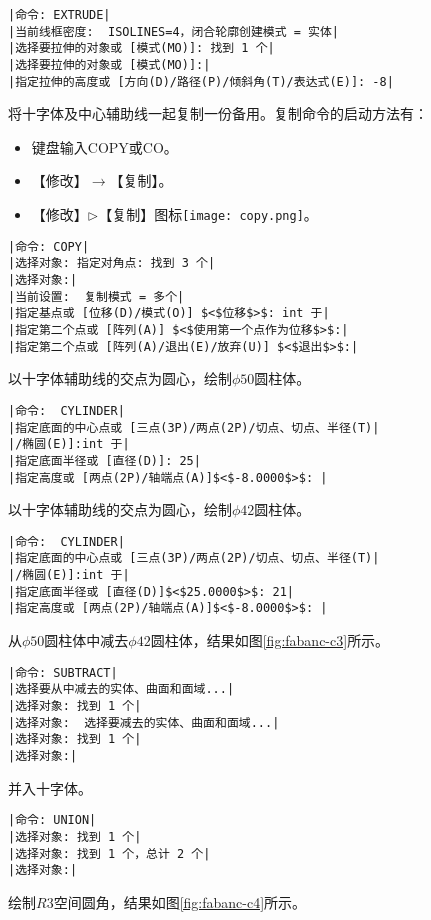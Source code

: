 \begin{procedure}
\begin{lstlisting}
|命令: EXTRUDE|
|当前线框密度:  ISOLINES=4，闭合轮廓创建模式 = 实体|
|选择要拉伸的对象或 [模式(MO)]: 找到 1 个|
|选择要拉伸的对象或 [模式(MO)]:|
|指定拉伸的高度或 [方向(D)/路径(P)/倾斜角(T)/表达式(E)]: -8|
\end{lstlisting}
将十字体及中心辅助线一起复制一份备用。复制命令的启动方法有：
\begin{itemize}
\item 键盘输入COPY或CO。
\item 【修改】$\rightarrow$【复制】。
\item 【修改】$\triangleright$【复制】图标\texttt{[image: copy.png]}。
\end{itemize}
\begin{lstlisting}
|命令: COPY|
|选择对象: 指定对角点: 找到 3 个|
|选择对象:|
|当前设置:  复制模式 = 多个|
|指定基点或 [位移(D)/模式(O)] $<$位移$>$: int 于|
|指定第二个点或 [阵列(A)] $<$使用第一个点作为位移$>$:|
|指定第二个点或 [阵列(A)/退出(E)/放弃(U)] $<$退出$>$:|
\end{lstlisting}
\item 以十字体辅助线的交点为圆心，绘制$\phi 50$圆柱体。
\begin{lstlisting}
|命令:  CYLINDER|
|指定底面的中心点或 [三点(3P)/两点(2P)/切点、切点、半径(T)|
|/椭圆(E)]:int 于|
|指定底面半径或 [直径(D)]: 25|
|指定高度或 [两点(2P)/轴端点(A)]$<$-8.0000$>$: |
\end{lstlisting}
\item 以十字体辅助线的交点为圆心，绘制$\phi 42$圆柱体。
\begin{lstlisting}
|命令:  CYLINDER|
|指定底面的中心点或 [三点(3P)/两点(2P)/切点、切点、半径(T)|
|/椭圆(E)]:int 于|
|指定底面半径或 [直径(D)]$<$25.0000$>$: 21|
|指定高度或 [两点(2P)/轴端点(A)]$<$-8.0000$>$: |
\end{lstlisting}
\newpage
\item 从$\phi 50$圆柱体中减去$\phi 42$圆柱体，结果如图\ref{fig:fabanc-c3}所示。
\begin{lstlisting}
|命令: SUBTRACT|
|选择要从中减去的实体、曲面和面域...|
|选择对象: 找到 1 个|
|选择对象:  选择要减去的实体、曲面和面域...|
|选择对象: 找到 1 个|
|选择对象:|
\end{lstlisting}
\item 并入十字体。
\begin{lstlisting}
|命令: UNION|
|选择对象: 找到 1 个|
|选择对象: 找到 1 个，总计 2 个|
|选择对象:|
\end{lstlisting}
\item 绘制$R3$空间圆角，结果如图\ref{fig:fabanc-c4}所示。

\end{procedure}
